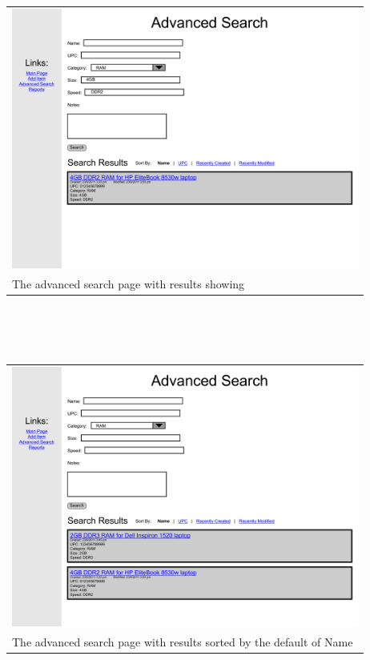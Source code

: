 \documentclass{article}
\begin{document}
\begin{tabular}{ p{4.5in} }
\includegraphics[keepaspectratio, width=4.5in]{advancedSearchF0S3.pdf} \\
The advanced search page with results showing
\end{tabular}\\
~\\
~\\
\begin{tabular}{ p{4.5in} }
\includegraphics[keepaspectratio, width=4.5in]{sortResultsF0S0.pdf} \\
The advanced search page with results sorted by the default of Name
\end{tabular}\\
~\\
~\\
\end{document}
